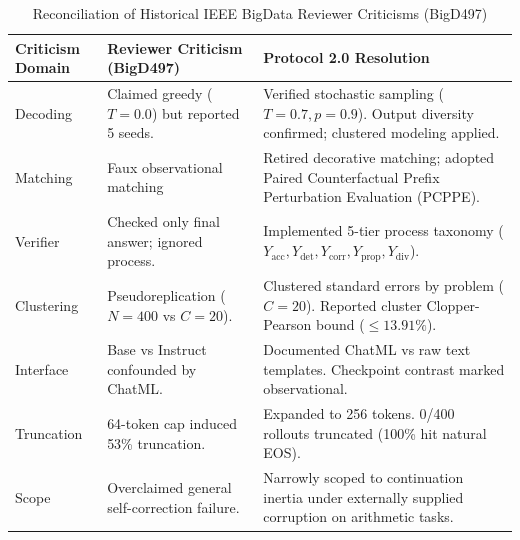 \documentclass[11pt,letterpaper]{article}
\begin{document}
\begin{table}[htbp]
\centering
\small
\caption{Reconciliation of Historical IEEE BigData Reviewer Criticisms (BigD497)}
\label{tab:app_reconciliation}
\begin{tabularx}{\textwidth}{p{3.0cm}p{4.5cm}X}
\toprule
\textbf{Criticism Domain} & \textbf{Reviewer Criticism (BigD497)} & \textbf{Protocol 2.0 Resolution} \\
\midrule
Decoding & Claimed greedy ($T=0.0$) but reported 5 seeds. & Verified stochastic sampling ($T=0.7, p=0.9$). Output diversity confirmed; clustered modeling applied. \\
Matching & Faux observational matching & Retired decorative matching; adopted Paired Counterfactual Prefix Perturbation Evaluation (PCPPE). \\
Verifier & Checked only final answer; ignored process. & Implemented 5-tier process taxonomy ($Y_{\text{acc}}, Y_{\text{det}}, Y_{\text{corr}}, Y_{\text{prop}}, Y_{\text{div}}$). \\
Clustering & Pseudoreplication ($N=400$ vs $C=20$). & Clustered standard errors by problem ($C=20$). Reported cluster Clopper-Pearson bound ($\le 13.91\%$). \\
Interface & Base vs Instruct confounded by ChatML. & Documented ChatML vs raw text templates. Checkpoint contrast marked observational. \\
Truncation & 64-token cap induced 53\% truncation. & Expanded to 256 tokens. 0/400 rollouts truncated (100\% hit natural EOS). \\
Scope & Overclaimed general self-correction failure. & Narrowly scoped to continuation inertia under externally supplied corruption on arithmetic tasks. \\
\bottomrule
\end{tabularx}
\end{table}
\end{document}
